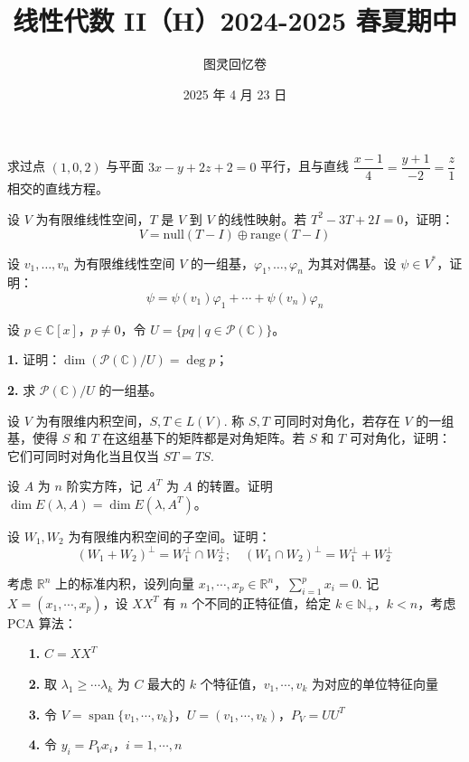 \documentclass[UTF8,14pt,normal]{ctexart}
\title{\textbf{线性代数 II（H）2024-2025 春夏期中}}
\author{图灵回忆卷}
\date{2025 年 4 月 23 日}
\begin{document}
\maketitle

 求过点 $(1, 0, 2)$ 与平面 $3x - y + 2z + 2 = 0$ 平行，且与直线 $\dfrac{x-1}{4}=\dfrac{y+1}{-2}=\dfrac{z}{1}$ 相交的直线方程。

 设 $V$ 为有限维线性空间，$T$ 是 $V$ 到 $V$ 的线性映射。若 $T^2 - 3T + 2I = 0$，证明：
\[V = \text{null}(T - I) \oplus \text{range}(T - I)\]

 设 $v_1, \ldots, v_n$ 为有限维线性空间 $V$ 的一组基，$\varphi_1, \ldots, \varphi_n$ 为其对偶基。设 $\psi \in V^*$，证明：
\[\psi = \psi(v_1)\varphi_1 + \cdots + \psi(v_n)\varphi_n\]

 设 $p \in \mathbb{C}[x]$，$p \neq 0$，令 $U = \{pq \mid q \in \mathcal{P}(\mathbb{C})\}$。

\textbf{1.} 证明：$\dim(\mathcal{P}(\mathbb{C}) / U) = \deg p$；

\textbf{2.} 求 $\mathcal{P}(\mathbb{C}) / U$ 的一组基。

 设 $V$ 为有限维内积空间，$S, T \in L(V)$. 称 $S,T$ 可同时对角化，若存在 $V$ 的一组基，使得 $S$ 和 $T$ 在这组基下的矩阵都是对角矩阵。若 $S$ 和 $T$ 可对角化，证明：它们可同时对角化当且仅当 $ST = TS$.

 设 $A$ 为 $n$ 阶实方阵，记 $A^{T}$ 为 $A$ 的转置。证明 $\dim E(\lambda, A) = \dim E(\lambda, A^{T})$。

 设 $W_1, W_2$ 为有限维内积空间的子空间。证明：
\[(W_1 + W_2)^\perp = W_1^\perp \cap W_2^\perp;\quad (W_1 \cap W_2)^\perp = W_1^\perp + W_2^\perp\]

 考虑 $\mathbb{R}^n$ 上的标准内积，设列向量 $x_1,\cdots,x_p\in\mathbb{R}^n$，$\displaystyle\sum_{i=1}^p x_i=0$. 记 $X=(x_1,\cdots,x_p)$，设 $XX^{T}$ 有 $n$ 个不同的正特征值，给定 $k\in\mathbb{N}_+$，$k<n$，考虑 PCA 算法：
\begin{enumerate}
    \item[\textbf{1.}] $C=XX^{T}$
    \item[\textbf{2.}] 取 $\lambda_1\ge\cdots\lambda_k$ 为 $C$ 最大的 $k$ 个特征值，$v_1,\cdots,v_k$ 为对应的单位特征向量
    \item[\textbf{3.}] 令 $V=\operatorname{span}\{v_1,\cdots,v_k\}$，$U=(v_1,\cdots,v_k)$，$P_V=UU^{T}$
    \item[\textbf{4.}] 令 $y_i=P_V x_i$，$i=1,\cdots,n$
\end{enumerate}
\end{document}
